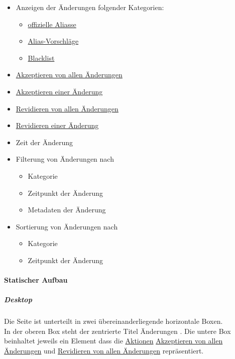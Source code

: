 \begin{itemize}
    \item Anzeigen der Änderungen folgender Kategorien: \begin{itemize}
        \item \hyperref[AP_Offizielle_Aliasse]{offizielle Aliasse}
        \item \hyperref[AP_Alias_Vorschlage]{Alias-Vorschläge} 
        \item \hyperref[AP_Blacklist]{Blacklist}
    \end{itemize}
    \item \hyperref[AP_Aktionen_Anderungen_Akzeptiere_Alle]{Akzeptieren von allen Änderungen}
    \item \hyperref[AP_Aktionen_Anderungen_Akzeptieren]{Akzeptieren einer Änderung}
    \item \hyperref[AP_Aktionen_Anderungen_Revidiere_Alle]{Revidieren von allen Änderungen}
    \item \hyperref[AP_Aktionen_Anderungen_Revidieren]{Revidieren einer Änderung}
    \item Zeit der Änderung
    \item Filterung von Änderungen nach 
    \begin{itemize}
        \item Kategorie
        \item Zeitpunkt der Änderung
        \item Metadaten der Änderung
    \end{itemize}
    \item Sortierung von Änderungen nach 
    \begin{itemize}
        \item Kategorie
        \item Zeitpunkt der Änderung
    \end{itemize}
\end{itemize}

\paragraph*{Statischer Aufbau}
\subparagraph*{Desktop}
Die Seite ist unterteilt in zwei übereinanderliegende horizontale Boxen. \\
In der oberen Box steht der zentrierte Titel \dq Änderungen \dq.
Die untere Box beinhaltet jeweils ein Element dass die \hyperref[AP_Aktionen_Anderungen]{Aktionen} \hyperref[AP_Aktionen_Anderungen_Akzeptiere_Alle]{Akzeptieren von allen Änderungen} und \hyperref[AP_Aktionen_Anderungen_Revidiere_Alle]{Revidieren von allen Änderungen} repräsentiert.

